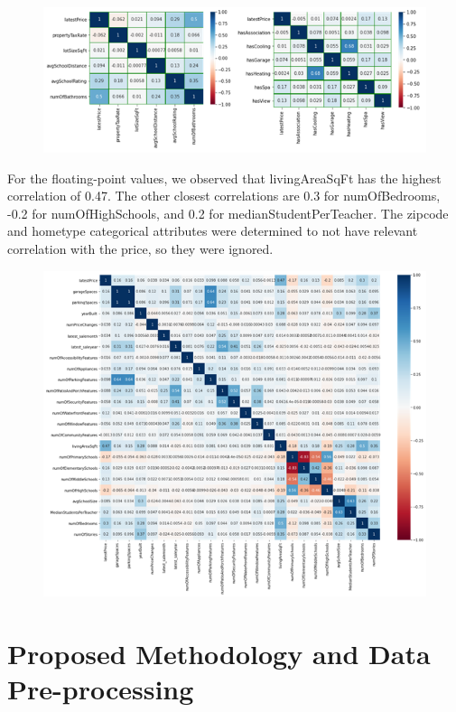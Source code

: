 \documentclass[a4paper]{article}
\begin{document}
	\begin{figure}[H]
		\label{fig:fig2}
		\includegraphics[width=1\linewidth]{fig2}
	\end{figure}
	
	For the floating-point values, we observed that livingAreaSqFt has the highest correlation of 0.47. The other closest correlations are 0.3 for numOfBedrooms, -0.2 for numOfHighSchools, and 0.2 for medianStudentPerTeacher. The zipcode and hometype categorical attributes were determined to not have relevant correlation with the price, so they were ignored.
	
	\begin{figure}[H]
		\caption{}
		\label{fig:fig3}
		\includegraphics[width=1\linewidth]{fig3}
	\end{figure}
	
	\section{Proposed Methodology and Data Pre-processing}
	
\end{document}
